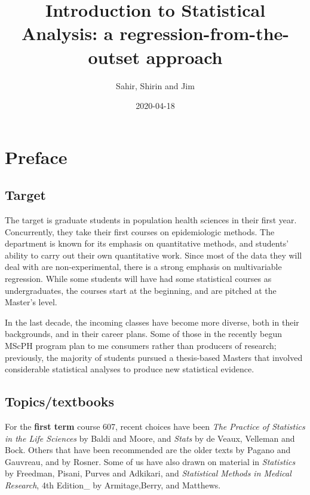 \documentclass[]{book}
\title{Introduction to Statistical Analysis: a regression-from-the-outset approach}
\author{Sahir, Shirin and Jim}
\date{2020-04-18}
\begin{document}
\maketitle

{
\setcounter{tocdepth}{1}
\tableofcontents
}
\hypertarget{preface}{%
\chapter*{Preface}\label{preface}}

\hypertarget{target}{%
\section{Target}\label{target}}

The target is graduate students in population health sciences in their first year. Concurrently, they take their first courses on epidemiologic methods. The department is known for its emphasis on quantitative methods, and students' ability to carry out their own quantitative work. Since most of the data they will deal with are non-experimental, there is a strong emphasis on multivariable regression. While some students will have had some statistical courses as undergraduates, the courses start at the beginning, and are pitched at the Master's level.

In the last decade, the incoming classes have become more diverse, both in their backgrounds, and in their career plans. Some of those in the recently begun MScPH program plan to me consumers rather than producers of research; previously, the majority of students pursued a thesis-based Masters that involved considerable statistical analyses to produce new statistical evidence.

\hypertarget{topicstextbooks}{%
\section{Topics/textbooks}\label{topicstextbooks}}

For the \textbf{first term} course 607, recent choices have been \emph{The Practice of Statistics in the Life Sciences} by Baldi and Moore, and \emph{Stats} by de Veaux, Velleman and Bock. Others that have been recommended are the older texts by Pagano and Gauvreau, and by Rosner. Some of us have also drawn on material in \emph{Statistics} by Freedman, Pisani, Purves and Adkikari, and
\emph{Statistical Methods in Medical Research}, 4th Edition\_ by
Armitage,Berry, and Matthews.
\end{document}
